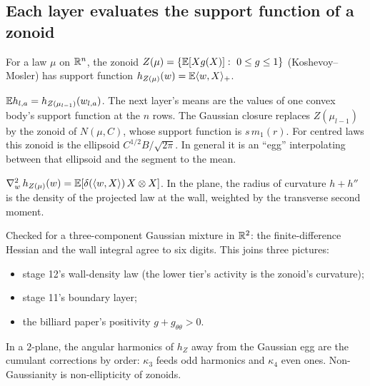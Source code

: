 \subsection{Each layer evaluates the support function of a zonoid}
For a law $\mu$ on $\mathbb R^n$, the zonoid $Z(\mu)=\{\mathbb E[Xg(X)]:\ 0\le g\le1\}$ (Koshevoy--Mosler) has support function $h_{Z(\mu)}(w)=\mathbb E\langle w,X\rangle_+$.
\begin{proposition}
$\mathbb E h_{l,a}=h_{Z(\mu_{l-1})}(w_{l,a})$. The next layer's means are the values of one convex body's support function at the $n$ rows.
The Gaussian closure replaces $Z(\mu_{l-1})$ by the zonoid of $N(\mu,C)$, whose support function is $s\,m_1(r)$. For centred laws this
zonoid is the ellipsoid $C^{1/2}B/\sqrt{2\pi}$. In general it is an ``egg'' interpolating between that ellipsoid and the segment to the mean.
\end{proposition}
\begin{proposition}\label{prop:curv}
$\nabla_w^2\,h_{Z(\mu)}(w)=\mathbb E[\delta(\langle w,X\rangle)\,X\otimes X]$. In the plane, the radius of curvature $h+h''$ is the density of the projected
law at the wall, weighted by the transverse second moment.
\end{proposition}
Checked for a three-component Gaussian mixture in $\mathbb R^2$: the finite-difference Hessian and the wall integral agree to six digits.
This joins three pictures:
\begin{itemize}[leftmargin=*]
\item stage 12's wall-density law (the lower tier's activity is the zonoid's curvature);
\item stage 11's boundary layer;
\item the billiard paper's positivity $g+g_{\theta\theta}>0$.
\end{itemize}
In a $2$-plane, the angular harmonics of $h_Z$ away from the Gaussian egg are the cumulant corrections by order: $\kappa_3$ feeds odd
harmonics and $\kappa_4$ even ones. Non-Gaussianity is non-ellipticity of zonoids.

